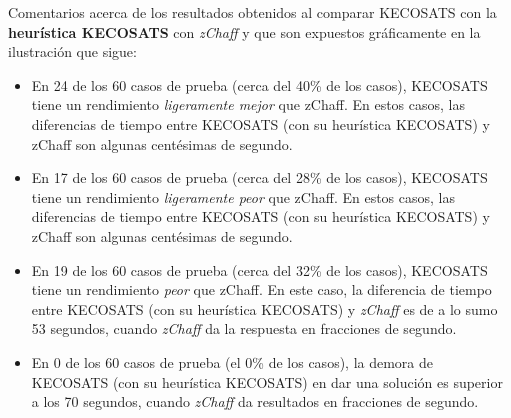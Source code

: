 \documentclass[12pt,lettersize,oneside]{article}
\begin{document}
Comentarios acerca de los resultados obtenidos al comparar KECOSATS con la
\textbf{heurística KECOSATS} con \emph{zChaff} y que son expuestos gráficamente en la ilustración que
sigue:\vspace{-2.5mm}
\begin{itemize}
\item En 24 de los 60 casos de prueba (cerca del 40\% de los casos), KECOSATS
  tiene un rendimiento \emph{ligeramente mejor} que zChaff. En estos casos, las
  diferencias de tiempo entre KECOSATS (con su heurística KECOSATS) y zChaff son
  algunas centésimas de segundo.
\item En 17 de los 60 casos de prueba (cerca del 28\% de los casos), KECOSATS
  tiene un rendimiento \emph{ligeramente peor} que zChaff. En estos casos, las
  diferencias de tiempo entre KECOSATS (con su heurística KECOSATS) y zChaff son
  algunas centésimas de segundo.
\item En 19 de los 60 casos de prueba (cerca del 32\% de los casos), KECOSATS
  tiene un rendimiento \emph{peor} que zChaff. En este caso, la diferencia de
  tiempo entre KECOSATS (con su heurística KECOSATS) y \emph{zChaff} es de a lo
  sumo 53 segundos, cuando \emph{zChaff} da la respuesta en fracciones de segundo.
\item En 0 de los 60 casos de prueba (el 0\% de los casos), la demora de
  KECOSATS (con su heurística KECOSATS) en dar una solución es superior a los 70
  segundos, cuando \emph{zChaff} da resultados en fracciones de segundo.
\end{itemize}


\end{document}
